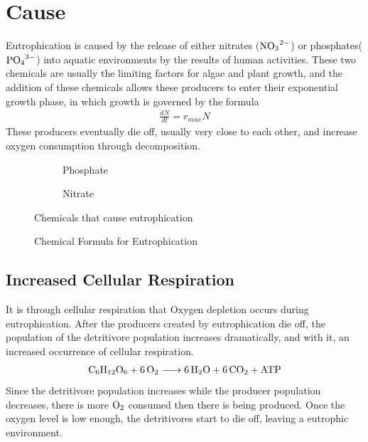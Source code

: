 \documentclass{article}
\begin{document}
\section{Cause}
Eutrophication is caused by the release of either nitrates ($\ce{NO3^2-}$) or phosphates($\ce{PO4^3-}$) into aquatic environments by the results of human activities.
These two chemicals are usually the limiting factors for algae and plant growth, and the addition of these chemicals allows these producers to enter their exponential growth phase, in which growth is governed by the formula
\begin{align}
    \frac{dN}{dt} = r_{max}N
\end{align}
These producers eventually die off, usually very close to each other, and increase oxygen consumption through decomposition.
\begin{figure}[h]
    \begin{subfigure}{.5\textwidth}
        \centering
        \caption{Phosphate}
    \end{subfigure}%
    \begin{subfigure}{.5\textwidth}
        \centering
        \caption{Nitrate}
    \end{subfigure}
    \caption{Chemicals that cause eutrophication}
\end{figure}
\begin{figure}[h]
	\centering
	\caption{Chemical Formula for Eutrophication}
\end{figure}
    \subsection{Increased Cellular Respiration}
    It is through cellular respiration that Oxygen depletion occurs during eutrophication.
    After the producers created by eutrophication die off, the population of the detritivore population increases dramatically, and with it, an increased occurrence of cellular respiration.
    \begin{align}
        \ce{C6H12O6 + 6O2 -> 6H2O + 6CO2 + ATP}
    \end{align}
    Since the detritivore population increases while the producer population decreases, there is more $\ce{O2}$ consumed then there is being produced.
    Once the oxygen level is low enough, the detritivores start to die off, leaving a eutrophic environment.
\end{document}
